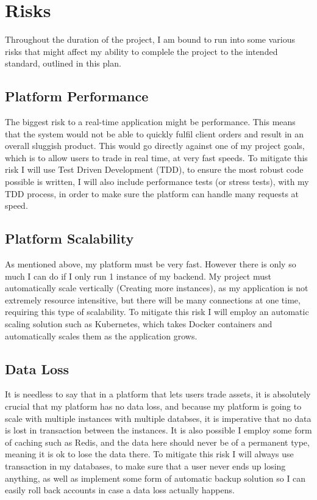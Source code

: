 \documentclass[titlepage]{article}
\begin{document}
\pagebreak

\section{Risks}
Throughout  the duration of the project, I am bound to run into some various risks that might affect my ability to complele the project to the intended standard, outlined in this plan.

\subsection{Platform Performance}
The biggest risk to a real-time application might be performance. This means that the system would not be able to quickly fulfil client orders and result in an overall sluggish product. This would go directly against one of my project goals, which is to allow users to trade in real time, at very fast speeds. To mitigate this risk I will use Test Driven Development (TDD), to ensure the most robust code possible is written, I will also include performance tests (or stress tests), with my TDD process, in order to make sure the platform can handle many requests at speed.

\subsection{Platform Scalability}
As mentioned above, my platform must be very fast. However there is only so much I can do if I only run 1 instance of my backend. My project must automatically scale vertically (Creating more instances), as my application is not extremely resource intensitive, but there will be many connections at one time, requiring this type of scalability. To mitigate this risk I will employ an automatic scaling solution such as Kubernetes, which takes Docker containers and automatically scales them as the application grows.

\subsection{Data Loss}
It is needless to say that in a platform that lets users trade assets, it is absolutely crucial that my platform has no data loss, and because my platform is going to scale with multiple instances with multiple databses, it is imperative that no data is lost in transaction between the instances. It is also possible I employ some form of caching such as Redis, and the data here should never be of a permanent type, meaning it is ok to lose the data there. To mitigate this risk I will always use transaction in my databases, to make sure that a user never ends up losing anything, as well as implement some form of automatic backup solution so I can easily roll back accounts in case a data loss actually happens.
\end{document}
